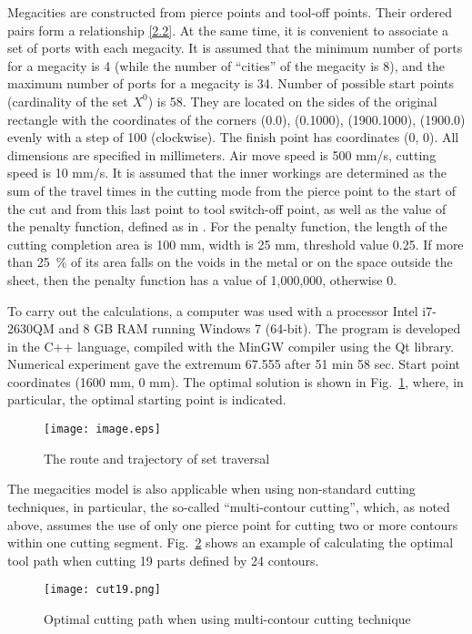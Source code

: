 \documentclass[10pt]{article}
\begin{document}
Megacities are constructed from pierce points and tool-off points.
Their ordered pairs form a relationship \eqref{2.2}.
At the same time,
it is convenient to associate a set of ports with each megacity.
It is assumed that the minimum number of ports for a megacity is 4
(while the number of ``cities'' of the megacity is 8),
and the maximum number of ports for a megacity is 34.
Number of possible start points
(cardinality of the set $ X ^ 0 $)
is 58.
They are located on the sides of the original rectangle
with the coordinates of the corners
(0.0), (0.1000), (1900.1000), (1900.0)
evenly with a step of 100
(clockwise).
The finish point has coordinates (0, 0).
All dimensions are specified in millimeters.
Air move speed is 500 mm/s,
cutting speed is 10 mm/s.
It is assumed that the inner workings are determined
as the sum of the travel times in the cutting mode
from the pierce point to the start of the cut
and from this last point to
tool switch-off point,
as well as the value of the penalty function,
defined as in
\cite{18}.
For the penalty function,
the length of the cutting completion area is 100 mm,
width is 25 mm,
threshold value 0.25.
If more than 25~\% of its area
falls on the voids in the metal or on the space outside the sheet,
then the penalty function has a value of 1,000,000, otherwise 0.

To carry out the calculations,
a computer
was used
with a processor
Intel i7-2630QM and 8 GB RAM
running Windows 7 (64-bit).
The program is developed in the C++ language,
compiled with the MinGW compiler using the Qt library.
Numerical experiment gave the extremum 67.555
after
51 min 58 sec.
Start point coordinates
(1600 mm, 0 mm).
The optimal solution is shown in Fig.~\ref{fig:1},
where, in particular, the optimal starting point is indicated.

\begin{figure}
  \centering
  \texttt{[image: image.eps]}
  \caption{The route and trajectory of set traversal}
  \label{fig:1}
\end{figure}

The megacities model is also applicable
when using non-standard cutting techniques,
in particular, the so-called ``multi-contour cutting'',
which, as noted above, assumes the use of only
one pierce point
for cutting two or more contours within one cutting segment.
Fig.~\ref{fig:2}
shows an example of calculating the optimal tool path
when cutting 19 parts defined by 24 contours.

\begin{figure}
  \centering
  \texttt{[image: cut19.png]}
  \caption{Optimal cutting path when using multi-contour cutting technique}
  \label{fig:2}
\end{figure}
\end{document}
